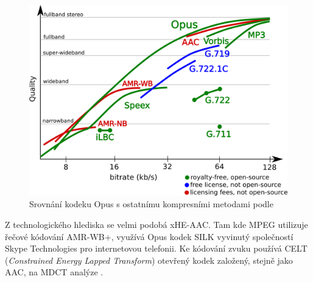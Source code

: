 \begin{figure}[h]
    \centering
    \includegraphics[width=.55\textwidth]{pic/opus.png}
    \caption{Srovnání kodeku Opus s ostatnímu kompresními metodami podle \cite{web:opus}}
    \label{pic:opus}
\end{figure}

Z technologického hlediska se velmi podobá xHE-AAC. Tam kde MPEG utilizuje řečové kódování AMR-WB+, využívá Opus kodek SILK vyvinutý společností Skype Technologies pro internetovou telefonii. Ke kódování zvuku používá CELT (\textit{Constrained Energy Lapped Transform}) otevřený kodek založený, stejně jako AAC, na MDCT analýze \cite{norm:opus}.